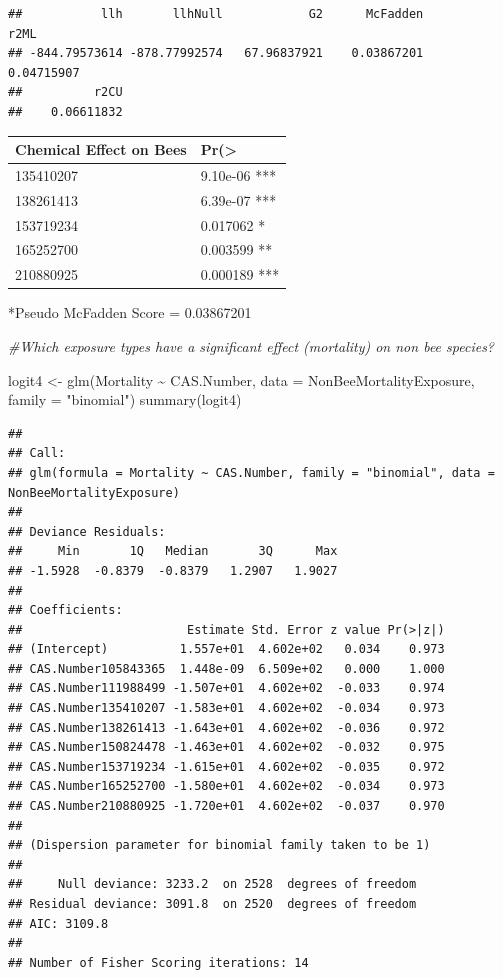 \documentclass[
  12pt,
]{article}
\newenvironment{Shaded}{\begin{snugshade}}{\end{snugshade}}
\newcommand{\AttributeTok}[1]{\textcolor[rgb]{0.77,0.63,0.00}{#1}}
\newcommand{\CommentTok}[1]{\textcolor[rgb]{0.56,0.35,0.01}{\textit{#1}}}
\newcommand{\FunctionTok}[1]{\textcolor[rgb]{0.00,0.00,0.00}{#1}}
\newcommand{\NormalTok}[1]{#1}
\newcommand{\OtherTok}[1]{\textcolor[rgb]{0.56,0.35,0.01}{#1}}
\newcommand{\SpecialCharTok}[1]{\textcolor[rgb]{0.00,0.00,0.00}{#1}}
\newcommand{\StringTok}[1]{\textcolor[rgb]{0.31,0.60,0.02}{#1}}
\begin{document}
\begin{verbatim}
##           llh       llhNull            G2      McFadden          r2ML 
## -844.79573614 -878.77992574   67.96837921    0.03867201    0.04715907 
##          r2CU 
##    0.06611832
\end{verbatim}

\begin{longtable}[]{@{}ll@{}}
\toprule
Chemical Effect on Bees & Pr(\textgreater{} \\
\midrule
\endhead
135410207 & 9.10e-06 *** \\
138261413 & 6.39e-07 *** \\
153719234 & 0.017062 * \\
165252700 & 0.003599 ** \\
210880925 & 0.000189 *** \\
\bottomrule
\end{longtable}

*Pseudo McFadden Score = 0.03867201

\begin{Shaded}
\begin{Highlighting}[]
\CommentTok{\#Which exposure types have a significant effect (mortality) on non bee species?}

\NormalTok{logit4 }\OtherTok{\textless{}{-}} \FunctionTok{glm}\NormalTok{(Mortality }\SpecialCharTok{\textasciitilde{}}\NormalTok{ CAS.Number, }\AttributeTok{data =}\NormalTok{ NonBeeMortalityExposure, }\AttributeTok{family =} \StringTok{"binomial"}\NormalTok{)}
\FunctionTok{summary}\NormalTok{(logit4)}
\end{Highlighting}
\end{Shaded}

\begin{verbatim}
## 
## Call:
## glm(formula = Mortality ~ CAS.Number, family = "binomial", data = NonBeeMortalityExposure)
## 
## Deviance Residuals: 
##     Min       1Q   Median       3Q      Max  
## -1.5928  -0.8379  -0.8379   1.2907   1.9027  
## 
## Coefficients:
##                       Estimate Std. Error z value Pr(>|z|)
## (Intercept)          1.557e+01  4.602e+02   0.034    0.973
## CAS.Number105843365  1.448e-09  6.509e+02   0.000    1.000
## CAS.Number111988499 -1.507e+01  4.602e+02  -0.033    0.974
## CAS.Number135410207 -1.583e+01  4.602e+02  -0.034    0.973
## CAS.Number138261413 -1.643e+01  4.602e+02  -0.036    0.972
## CAS.Number150824478 -1.463e+01  4.602e+02  -0.032    0.975
## CAS.Number153719234 -1.615e+01  4.602e+02  -0.035    0.972
## CAS.Number165252700 -1.580e+01  4.602e+02  -0.034    0.973
## CAS.Number210880925 -1.720e+01  4.602e+02  -0.037    0.970
## 
## (Dispersion parameter for binomial family taken to be 1)
## 
##     Null deviance: 3233.2  on 2528  degrees of freedom
## Residual deviance: 3091.8  on 2520  degrees of freedom
## AIC: 3109.8
## 
## Number of Fisher Scoring iterations: 14
\end{verbatim}
\end{document}
